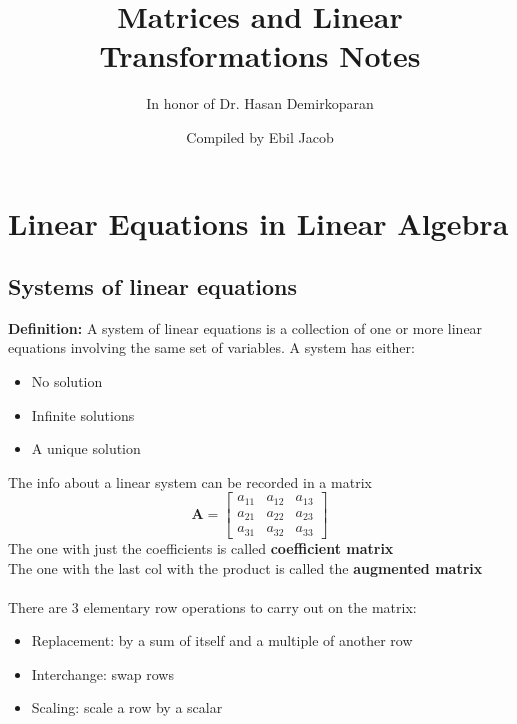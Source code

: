 \documentclass{report}
\title{Matrices and Linear Transformations Notes}
\author{In honor of Dr. Hasan Demirkoparan}
\date{Compiled by Ebil Jacob}
\begin{document}
\maketitle

\chapter{Linear Equations in Linear Algebra}

\section{Systems of linear equations}
\textbf{Definition:} A system of linear equations is a collection of one or more linear equations involving the same set of variables.
A system has either:
\begin{itemize}
    \item No solution
    \item Infinite solutions
    \item A unique solution
\end{itemize}
The info about a linear system can be recorded in a matrix
\[
\mathbf{A} = \begin{bmatrix}
a_{11} & a_{12} & a_{13} \\
a_{21} & a_{22} & a_{23} \\
a_{31} & a_{32} & a_{33}
\end{bmatrix}
\]
The one with just the coefficients is called \textbf{coefficient matrix}
\\The one with the last col with the product is called the \textbf{augmented matrix}
\\\\There are 3 elementary row operations to carry out on the matrix:
\begin{itemize}
    \item Replacement: by a sum of itself and a multiple of another row
    \item Interchange: swap rows
    \item Scaling: scale a row by a scalar
\end{itemize}
\end{document}
